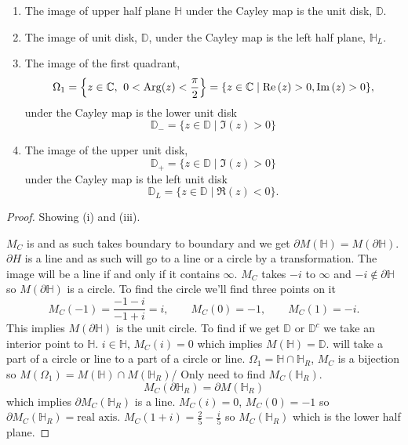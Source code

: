 \documentclass[10pt, a4paper]{article}
\begin{document}
\begin{lemma}\phantom{}
    \begin{enumerate}[label = (\roman*)]
        \item The image of upper half plane $\mathbb{H}$ under the Cayley map is the unit disk,
        $\mathbb{D}$.

        \item The image of unit disk,
        $\mathbb{D}$,
        under the Cayley map is the left half plane,
        $\mathbb{H}_{L}$.

        \item The image of the first quadrant,
        \[
        \Omega_1 = \left\{z \in \mathbb{C},\:\, 0 < \operatorname{Arg}(z) < \frac{\pi}{2}\right\} = \{z \in \mathbb{C}\mid \mathrm{Re}\,(z) > 0, \mathrm{Im}\,(z) > 0\},
        \]
        under the Cayley map is the lower unit disk
        \[
        \mathbb{D}_{-} = \{z \in \mathbb{D} \mid \Im(z) > 0\}
        \]

        \item The image of the upper unit disk,
        \[
        \mathbb{D}_{+} = \{z \in \mathbb{D} \mid \Im(z) > 0\}
        \]
        under the Cayley map is the left unit disk
        \[
        \mathbb{D}_{L} = \{z \in \mathbb{D} \mid \Re(z) < 0\}.
        \]
    \end{enumerate}

    \begin{proof}
        Showing (i) and (iii).

        $M_C$ is \mobius and as such takes boundary to boundary and we get $\partial M(\mathbb{H}) = M(\partial \mathbb{H})$.
        $\partial H$ is a line and as such will go to a line or a circle by a \mobius transformation.
        The image will be a line if and only if it contains $\infty$.
        $M_C$ takes $-i$ to $\infty$ and $-i \notin \partial \mathbb{H}$ so $M(\partial \mathbb{H})$ is a circle.
        To find the circle we'll find three points on it
        \[
        M_C(-1) = \frac{-1 - i}{-1 + i} = i ,\qquad M_C(0) = -1,\qquad M_C(1) = -i.
        \]
        This implies $M(\partial \mathbb{H})$ is the unit circle.
        To find if we get $\mathbb{D}$ or $\mathbb{D} ^ c$ we take an interior point to $\mathbb{H}$.
        $i \in \mathbb{H}$,
        $M_C(i) = 0$ which implies $M(\mathbb{H}) = \mathbb{D}$.
        \mobius will take a part of a circle or line to a part of a circle or line.
        $\Omega_1 = \mathbb{H} \cap \mathbb{H}_R$,
        $M_C$ is a bijection so $M(\Omega_1) = M(\mathbb{H}) \cap M(\mathbb{H}_R)$/
        Only need to find $M_C(\mathbb{H}_R)$.
        \[
        M_C(\partial \mathbb{H}_R) = \partial M(\mathbb{H}_R)
        \]
        which implies $\partial M_C(\mathbb{H}_R)$ is a line.
        $M_C(i) = 0$,
        $M_C(0) = -1$ so $\partial M_C(\mathbb{H}_R) = \text{real axis}$.
        $M_C(1 + i)  = \frac{2}{5} - \frac{i}{5}$ so $M_C(\mathbb{H}_R)$ which is the lower half plane.
    \end{proof}
\end{lemma}
\end{document}
